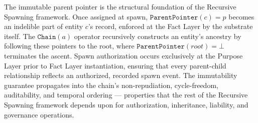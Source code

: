 The immutable parent pointer is the structural foundation of the Recursive Spawning framework. Once assigned at spawn, $\texttt{ParentPointer}(c) = p$ becomes an indelible part of entity $c$'s record, enforced at the Fact Layer by the substrate itself. The $\texttt{Chain}(a)$ operator recursively constructs an entity's ancestry by following these pointers to the root, where $\texttt{ParentPointer}(root) = \bot$ terminates the ascent. Spawn authorization occurs exclusively at the Purpose Layer prior to Fact Layer instantiation, ensuring that every parent-child relationship reflects an authorized, recorded spawn event. The immutability guarantee propagates into the chain's non-repudiation, cycle-freedom, auditability, and temporal ordering — properties that the rest of the Recursive Spawning framework depends upon for authorization, inheritance, liability, and governance operations.